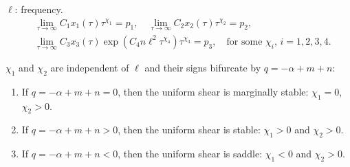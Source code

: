 \documentclass{beamer}
\begin{document}
\begin{frame}
$\ell$: frequency.
\begin{equation}
\begin{aligned}
 &\lim_{\tau \rightarrow \infty} C_1 x_1(\tau) \tau^{\chi_1} = p_1, \quad \lim_{\tau \rightarrow \infty} C_2x_2(\tau)  \tau^{\chi_2} = p_2, \\
&\lim_{\tau \rightarrow \infty} C_3 x_3(\tau) \exp\left(C_4n\ell^2 \tau^{\chi_4}\right)\tau^{\chi_3} = p_3, \quad \text{for some $\chi_i$, $i=1,2,3,4$}.
 \end{aligned}
\end{equation}


 \begin{theorem}[L, Tzavaras] \label{thm:1} $\chi_1$ and $\chi_2$ are independent of $\ell$ and their signs bifurcate by $q=-\alpha+m+n$:
 \begin{enumerate}
  \item If $q=-\alpha+m+n=0$, then the uniform shear is marginally stable: $\chi_1=0$, $\chi_2>0$.
  \item If $q=-\alpha+m+n>0$, then the uniform shear is stable: $\chi_1>0$ and $\chi_2>0$.
  \item If $q=-\alpha+m+n<0$, then the uniform shear is saddle: $\chi_1<0$ and $\chi_2>0$.
 \end{enumerate}
\end{theorem}
\end{frame}
\end{document}
